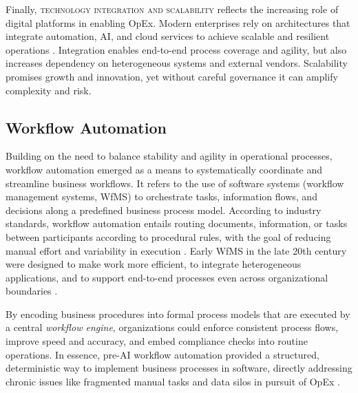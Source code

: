 Finally, \textsc{technology integration and scalability} reflects the increasing role of digital platforms in enabling OpEx. Modern enterprises rely on architectures that integrate automation, AI, and cloud services to achieve scalable and resilient operations \parencite{owoadeSystematic2024}. Integration enables end-to-end process coverage and agility, but also increases dependency on heterogeneous systems and external vendors. Scalability promises growth and innovation, yet without careful governance it can amplify complexity and risk.

\subsection{Workflow Automation}\label{subsec:workflow-auto}
Building on the need to balance stability and agility in operational processes, workflow automation emerged as a means to systematically coordinate and streamline business workflows. It refers to the use of software systems (workflow management systems, WfMS) to orchestrate tasks, information flows, and decisions along a predefined business process model. According to industry standards, workflow automation entails routing documents, information, or tasks between participants according to procedural rules, with the goal of reducing manual effort and variability in execution \parencite{basuResearch2002}. Early WfMS in the late 20th century were designed to make work more efficient, to integrate heterogeneous applications, and to support end-to-end processes even across organizational boundaries \parencite{stohrWorkflow2001}.

By encoding business procedures into formal process models that are executed by a central \emph{workflow engine}, organizations could enforce consistent process flows, improve speed and accuracy, and embed compliance checks into routine operations. In essence, pre-AI workflow automation provided a structured, deterministic way to implement business processes in software, directly addressing chronic issues like fragmented manual tasks and data silos in pursuit of OpEx \parencite{basuResearch2002}.

